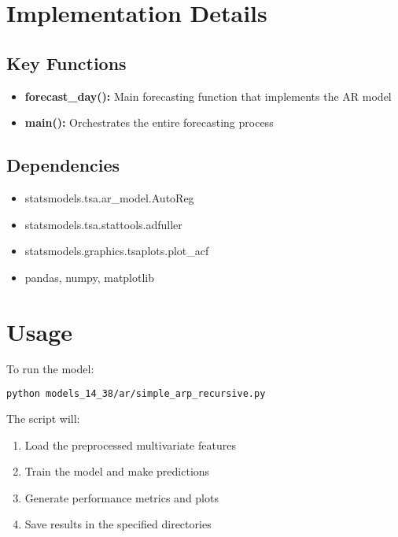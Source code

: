 \documentclass{article}
\begin{document}
\section{Implementation Details}

\subsection{Key Functions}
\begin{itemize}
    \item \textbf{forecast\_day():} Main forecasting function that implements the AR model
    \item \textbf{main():} Orchestrates the entire forecasting process
\end{itemize}

\subsection{Dependencies}
\begin{itemize}
    \item statsmodels.tsa.ar\_model.AutoReg
    \item statsmodels.tsa.stattools.adfuller
    \item statsmodels.graphics.tsaplots.plot\_acf
    \item pandas, numpy, matplotlib
\end{itemize}

\section{Usage}
To run the model:
\begin{lstlisting}[language=bash]
python models_14_38/ar/simple_arp_recursive.py
\end{lstlisting}

The script will:
\begin{enumerate}
    \item Load the preprocessed multivariate features
    \item Train the model and make predictions
    \item Generate performance metrics and plots
    \item Save results in the specified directories
\end{enumerate}
\end{document}
